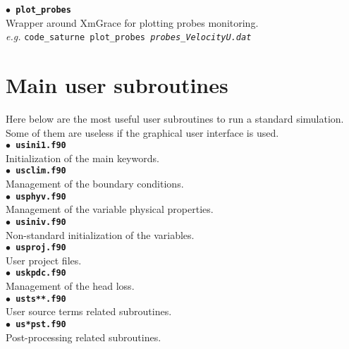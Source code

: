 \documentclass[a4paper,11pt]{article}
\newcommand{\refword}[1]{\texttt{$\bullet$ \bf{#1}}}
\begin{document}
\begin{multicols*}{3}
\refword{plot\_probes}\\
Wrapper around XmGrace for plotting probes monitoring.\\
\textit{e.g.} \texttt{code\_saturne plot\_probes \emph{probes\_VelocityU.dat}}


\section*{Main user subroutines}

Here below are the most useful user subroutines to run a standard
simulation. Some of them are useless if the graphical user interface
is used.\\

\refword{usini1.f90}\\
Initialization of the main keywords.\\

\refword{usclim.f90}\\
Management of the boundary conditions.\\

\refword{usphyv.f90}\\
Management of the variable physical properties.\\

\refword{usiniv.f90}\\
Non-standard initialization of the variables.\\

\refword{usproj.f90}\\
User project files.\\

\refword{uskpdc.f90}\\
Management of the head loss.\\

\refword{usts**.f90}\\
User source terms related subroutines.\\

\refword{us*pst.f90}\\
Post-processing related subroutines.\\





\end{multicols*}
\end{document}
